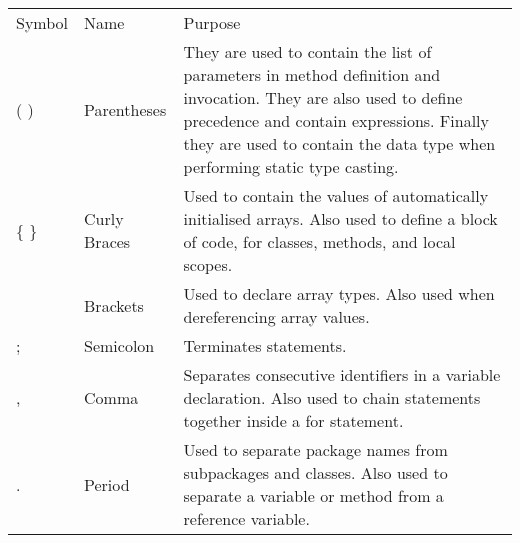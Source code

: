 \begin{center}
  \begin{tabular*}{0.9\textwidth}{@{\extracolsep{\fill}} l l p{4in} }
    Symbol & Name & Purpose \\
    ( ) & Parentheses & They are used to contain the list of parameters in method definition and invocation. They are also used to define precedence  and contain expressions. Finally they are used to contain the data type when performing static type casting. \\
    \{ \} & Curly Braces & Used to contain the values of automatically initialised arrays. Also used to define a block of code, for classes, methods, and local scopes. \\ \relax
    [ ] & Brackets & Used to declare array types. Also used when dereferencing array values. \\
    ; & Semicolon & Terminates statements. \\
    , & Comma & Separates consecutive identifiers in a variable declaration. Also used to chain statements together inside a for statement. \\
    . & Period & Used to separate package names from subpackages and classes. Also used to separate a variable or method from a reference variable.
  \end{tabular*}
\end{center}
